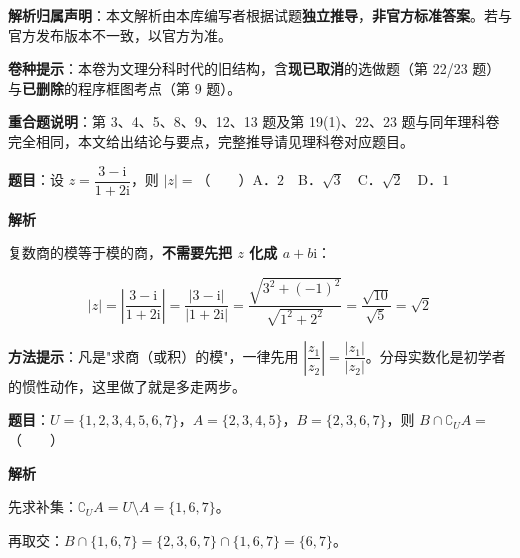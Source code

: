 

\begin{gknotice}
\textbf{ 解析归属声明}：本文解析由本库编写者根据试题\textbf{独立推导}，\textbf{非官方标准答案}。若与官方发布版本不一致，以官方为准。

\textbf{ 卷种提示}：本卷为文理分科时代的旧结构，含\textbf{现已取消}的选做题（第 22/23 题）与\textbf{已删除}的程序框图考点（第 9 题）。

\textbf{重合题说明}：第 3、4、5、8、9、12、13 题及第 19(1)、22、23 题与同年理科卷完全相同，本文给出结论与要点，完整推导请见理科卷对应题目。
\end{gknotice}

\par\medskip



\textbf{题目}：设 $z=\dfrac{3-\mathrm i}{1+2\mathrm i}$，则 $|z|=$（　　）A．$2$　B．$\sqrt3$　C．$\sqrt2$　D．$1$

\textbf{解析}

复数商的模等于模的商，\textbf{不需要先把 $z$ 化成 $a+b\mathrm i$}：

\[|z|=\left|\frac{3-\mathrm i}{1+2\mathrm i}\right|=\frac{|3-\mathrm i|}{|1+2\mathrm i|}=\frac{\sqrt{3^{2}+(-1)^{2}}}{\sqrt{1^{2}+2^{2}}}=\frac{\sqrt{10}}{\sqrt5}=\sqrt2\]


\begin{gktip}
\textbf{方法提示}：凡是"求商（或积）的模"，一律先用 $\left|\dfrac{z_1}{z_2}\right|=\dfrac{|z_1|}{|z_2|}$。分母实数化是初学者的惯性动作，这里做了就是多走两步。
\end{gktip}

\par\medskip


\textbf{题目}：$U=\{1,2,3,4,5,6,7\}$，$A=\{2,3,4,5\}$，$B=\{2,3,6,7\}$，则 $B\cap\complement_U A=$（　　）

\textbf{解析}

先求补集：$\complement_U A=U\setminus A=\{1,6,7\}$。

再取交：$B\cap\{1,6,7\}=\{2,3,6,7\}\cap\{1,6,7\}=\{6,7\}$。


\par\medskip

